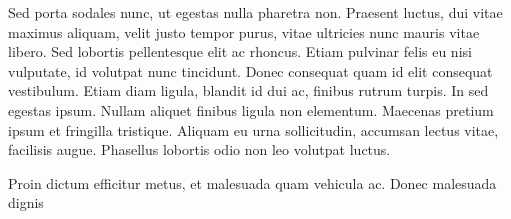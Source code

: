 \documentclass[12pt,a4paper]{article}
\begin{document}
Sed porta sodales nunc, ut egestas nulla pharetra non. Praesent luctus, dui vitae maximus aliquam, velit justo tempor purus, vitae ultricies nunc mauris vitae libero. Sed lobortis pellentesque elit ac rhoncus. Etiam pulvinar felis eu nisi vulputate, id volutpat nunc tincidunt. Donec consequat quam id elit consequat vestibulum. Etiam diam ligula, blandit id dui ac, finibus rutrum turpis. In sed egestas ipsum. Nullam aliquet finibus ligula non elementum. Maecenas pretium ipsum et fringilla tristique. Aliquam eu urna sollicitudin, accumsan lectus vitae, facilisis augue. Phasellus lobortis odio non leo volutpat luctus.

Proin dictum efficitur metus, et malesuada quam vehicula ac. Donec malesuada dignis \cite{bib4}



\end{document}
